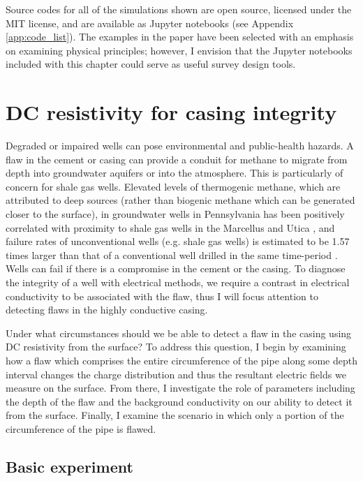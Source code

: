 Source codes for all of the simulations shown are open source, licensed under the MIT license, and are available as Jupyter notebooks (see Appendix \ref{app:code_list}). The examples in the paper have been selected with an emphasis on examining physical principles; however, I envision that the Jupyter notebooks included with this chapter could serve as useful survey design tools.
\section{DC resistivity for casing integrity}
\label{sec:casing_integrity}

Degraded or impaired wells can pose environmental and public-health hazards. A flaw in the cement or casing can provide a conduit for methane to migrate from depth into groundwater aquifers or into the atmosphere. This is particularly of concern for shale gas wells. Elevated levels of thermogenic methane, which are attributed to deep sources (rather than biogenic methane which can be generated closer to the surface), in groundwater wells in Pennsylvania has been positively correlated with proximity to shale gas wells in the Marcellus and Utica \citep{Osborn2011, Jackson2013}, and failure rates of unconventional wells (e.g. shale gas wells) is estimated to be 1.57 times larger than that of a conventional well drilled in the same time-period \citep{Ingraffea2014}. Wells can fail if there is a compromise in the cement or the casing. To diagnose the integrity of a well with electrical methods, we require a contrast in electrical conductivity to be associated with the flaw, thus I will focus attention to detecting flaws in the highly conductive casing.

Under what circumstances should we be able to detect a flaw in the casing using DC resistivity from the surface? To address this question, I begin by examining how a flaw which comprises the entire circumference of the pipe along some depth interval changes the charge distribution and thus the resultant electric fields we measure on the surface. From there, I investigate the role of parameters including the depth of the flaw and the background conductivity on our ability to detect it from the surface. Finally, I examine the scenario in which only a portion of the circumference of the pipe is flawed.

\subsection{Basic experiment}

